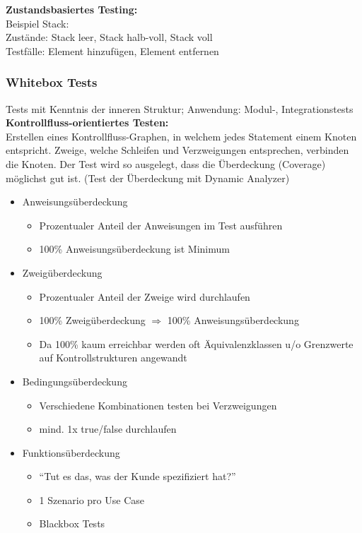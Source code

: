 \begin{multicols}{2}
\textbf{Zustandsbasiertes Testing:} \\
Beispiel Stack: \\
Zustände: Stack leer, Stack halb-voll, Stack voll \\
Testfälle: Element hinzufügen, Element entfernen \\

\subsubsection{Whitebox Tests}
Tests mit Kenntnis der inneren Struktur; Anwendung: Modul-, Integrationstests \\

\textbf{Kontrollfluss-orientiertes Testen:} \\
Erstellen eines Kontrollfluss-Graphen, in welchem jedes Statement einem Knoten entspricht. Zweige, welche Schleifen und Verzweigungen entsprechen, verbinden die Knoten. Der Test wird so ausgelegt, dass die Überdeckung (Coverage) möglichst gut ist. (Test der Überdeckung mit Dynamic Analyzer) \\

\begin{itemize}
	\item Anweisungsüberdeckung
			\begin{itemize}
				\item Prozentualer Anteil der Anweisungen im Test ausführen
				\item 100\% Anweisungsüberdeckung ist Minimum
			\end{itemize}
	\item Zweigüberdeckung
			\begin{itemize}
				\item Prozentualer Anteil der Zweige wird durchlaufen
				\item 100\% Zweigüberdeckung $\Rightarrow$ 100\% Anweisungsüberdeckung
				\item Da 100\% kaum erreichbar werden oft Äquivalenzklassen u/o Grenzwerte auf Kontrollstrukturen angewandt
			\end{itemize}
	\item Bedingungsüberdeckung
			\begin{itemize}
				\item Verschiedene Kombinationen testen bei Verzweigungen
				\item mind. 1x true/false durchlaufen
			\end{itemize}
	\item Funktionsüberdeckung
			\begin{itemize}
				\item ``Tut es das, was der Kunde spezifiziert hat?''
				\item 1 Szenario pro Use Case 
				\item Blackbox Tests
			\end{itemize}
\end{itemize}


\end{multicols}
